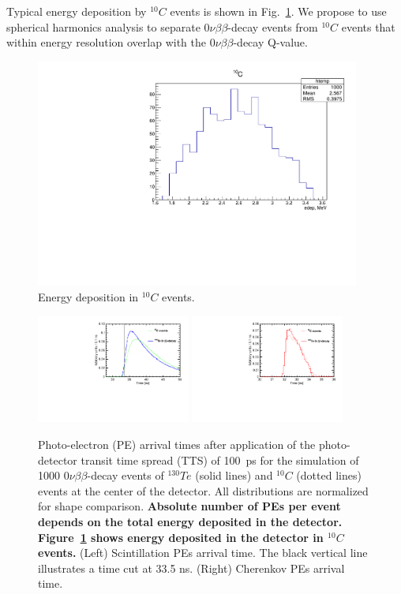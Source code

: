 \documentclass[12pt,twoside,letterpaper]{article}
\newcommand{\vbb}{0\nu\beta\beta}
\newcommand{\Te}{^{130}Te}
\newcommand{\Cten}{^{10}C}
\begin{document}
Typical energy deposition by $\Cten$ events is shown in Fig.~\ref{fig:Edep_C10}. We propose to use spherical harmonics analysis to separate $\vbb$-decay events from $\Cten$ events that within energy resolution overlap with the $\vbb$-decay Q-value.



\begin{figure}[htb]
\centering
\includegraphics[angle=0,width=0.95\textwidth]{plots/hEdep_C10.pdf}
\caption{Energy deposition in $\Cten$ events.}
\label{fig:Edep_C10}
\end{figure}

\begin{figure}[htb]
\centering
\includegraphics[angle=0,width=0.45\textwidth]{plots/hT_C10.pdf}
\includegraphics[angle=0,width=0.45\textwidth]{plots/hTche_C10.pdf}
\caption{Photo-electron (PE) arrival times after application of the photo-detector transit time spread (TTS) of 100~ps for the simulation of 1000 $\vbb$-decay events of $\Te$ (solid lines) and $\Cten$ (dotted lines) events at the center of the detector. All distributions are normalized for shape comparison. {\bf Absolute number of PEs per event depends on the total energy deposited in the detector. Figure~\ref{fig:Edep_C10} shows energy deposited in the detector in $\Cten$ events.} (Left) Scintillation PEs arrival time. The black vertical line illustrates a time cut at 33.5 ns. (Right) Cherenkov PEs arrival time.}
\label{fig:Arrival_time_C10}
\end{figure}
\end{document}
